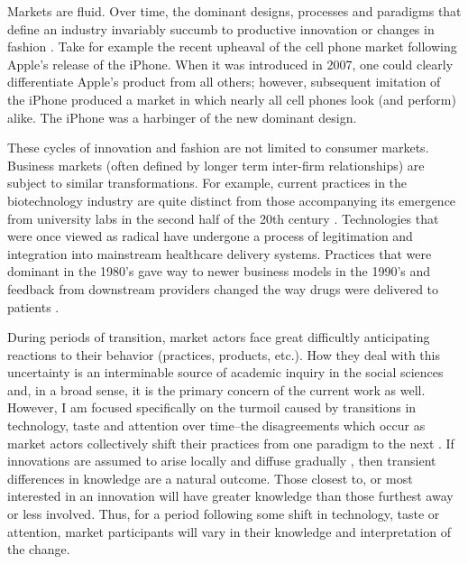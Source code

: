 
Markets are fluid. Over time, the dominant designs, processes and paradigms that define an industry invariably succumb to productive innovation or changes in fashion \citep{arthur2009, schumpeter1942, simmel1957}. Take for example the recent upheaval of the cell phone market following Apple's release of the iPhone. When it was introduced in 2007, one could clearly differentiate Apple's product from all others; however, subsequent imitation of the iPhone produced a market in which nearly all cell phones look (and perform) alike. The iPhone was a harbinger of the new dominant design.

These cycles of innovation and fashion are not limited to consumer markets. Business markets (often defined by longer term inter-firm relationships) are subject to similar transformations. For example, current practices in the biotechnology industry are quite distinct from those accompanying its emergence from university labs in the second half of the 20th century \citep{powell2005}. Technologies that were once viewed as radical have undergone a process of legitimation and integration into mainstream healthcare delivery systems. Practices that were dominant in the 1980's gave way to newer business models in the 1990's and feedback from downstream providers changed the way drugs were delivered to patients \citep{wolff2001}. 

During periods of transition, market actors face great difficultly anticipating reactions to their behavior (practices, products, etc.). How they deal with this uncertainty is an interminable source of academic inquiry in the social sciences \citep[see e.g.][]{alderson1965a, simon1957, thompson1967} and, in a broad sense, it is the primary concern of the current work as well. However, I am focused specifically on the turmoil caused by transitions in technology, taste and attention over time--the disagreements which occur as market actors collectively shift their practices from one paradigm to the next \citep{powell2008}. If innovations are assumed to arise locally and diffuse gradually \citep[see e.g.][]{bass1969, rogers2002}, then transient differences in knowledge are a natural outcome. Those closest to, or most interested in an innovation will have greater knowledge than those furthest away or less involved. Thus, for a period following some shift in technology, taste or attention, market participants will vary in their knowledge and interpretation of the change.

